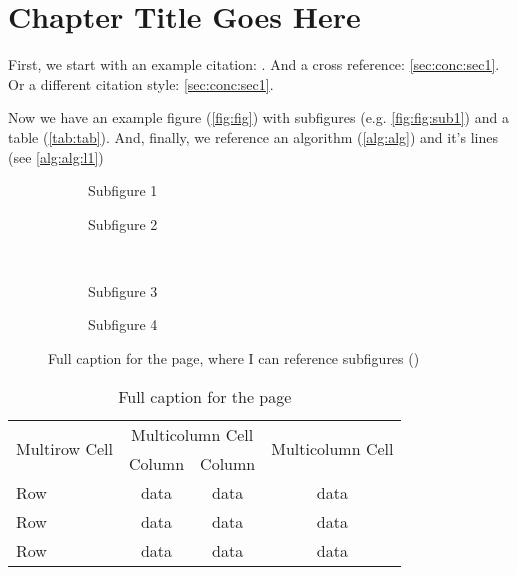 \documentclass{standalone}
\begin{document}
\graphicspath{{./images/chapter1/}}%
\chapter{Chapter Title Goes Here}
\label{chap:chap1}
First, we start with an example citation: \cite{NDHetal2015}. And a cross reference: \vref{sec:conc:sec1}. Or a different citation style: \cref{sec:conc:sec1}.

Now we have an example figure (\vref{fig:fig}) with subfigures (e.g. \vref{fig:fig:sub1}) and a table (\vref{tab:tab}). And, finally, we reference an algorithm (\vref{alg:alg}) and it's lines (see \cref{alg:alg:l1})

\begin{figure}
	\centering
	\begin{subfigure}[b]{0.45\linewidth}
		\centering
		\caption{Subfigure 1}\label{fig:fig:sub1}
	\end{subfigure}\quad
	\begin{subfigure}[b]{0.45\linewidth}
		\centering
		\caption{Subfigure 2}\label{fig:fig:sub2}
	\end{subfigure}\\
	\begin{subfigure}[b]{0.45\linewidth}
		\centering
		\caption{Subfigure 3}\label{fig:fig:sub3}
	\end{subfigure}\quad
	\begin{subfigure}[b]{0.45\linewidth}
		\centering
		\caption{Subfigure 4}\label{fig:fig:sub4}
	\end{subfigure}
	\caption[Short title for list of figures]{Full caption for the page, where I can reference subfigures ()}\label{fig:fig}
\end{figure}

\begin{table}
	\vspace*{10pt}
	\centering
	\renewcommand{\arraystretch}{1.5}
	\begin{tabular}{lccc}
		\toprule
		\multirow{2}{*}{Multirow Cell}&\multicolumn{2}{c}{Multicolumn Cell}&\multirow{2}{2cm}{\centering Multicolumn Cell} \\
		          & Column         & Column &    \\
		\midrule
		Row & data & data & data \\
		\midrule
		Row & data & data & data \\
		\midrule
		Row & data & data & data \\
		\bottomrule
	\end{tabular}
	\caption[Short title for list of tables]{Full caption for the page}\label{tab:tab}
	\vspace*{10pt}
\end{table}
\end{document}
